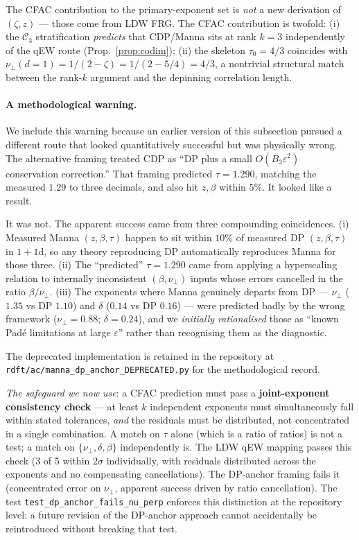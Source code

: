 \documentclass[10pt,a4paper,twocolumn]{article}
\theoremstyle{plain}
\theoremstyle{definition}
\newcommand{\eps}{\varepsilon}
\newcommand{\Cstr}[1]{\mathcal{C}_{#1}}
\begin{document}
The CFAC contribution to the primary-exponent set is \emph{not} a
new derivation of $(\zeta, z)$ --- those come from LDW FRG.  The
CFAC contribution is twofold: (i) the $\Cstr{3}$ stratification
\emph{predicts} that CDP/Manna sits at rank $k=3$ independently of
the qEW route (Prop.~\ref{prop:codim}); (ii) the skeleton
$\tau_0 = 4/3$ coincides with $\nu_\perp(d=1) = 1/(2 - \zeta) =
1/(2 - 5/4) = 4/3$, a nontrivial structural match between the
rank-$k$ argument and the depinning correlation length.

\paragraph{A methodological warning.}
\label{par:warning}
We include this warning because an earlier version of this
subsection pursued a different route that looked quantitatively
successful but was physically wrong.  The alternative framing
treated CDP as ``DP plus a small $O(B_3 \eps^2)$ conservation
correction.''  That framing predicted $\tau = 1.290$, matching
the measured $1.29$ to three decimals, and also hit $z, \beta$
within $5\%$.  It looked like a result.

It was not.  The apparent success came from three compounding
coincidences.  (i) Measured Manna $(z, \beta, \tau)$ happen to
sit within $10\%$ of measured DP $(z, \beta, \tau)$ in $1+1$d, so
any theory reproducing DP automatically reproduces Manna for
those three.  (ii) The ``predicted'' $\tau = 1.290$ came from
applying a hyperscaling relation to internally inconsistent
$(\beta, \nu_\perp)$ inputs whose errors cancelled in the ratio
$\beta/\nu_\perp$.  (iii) The exponents where Manna genuinely
departs from DP --- $\nu_\perp$ ($1.35$ vs DP $1.10$) and
$\delta$ ($0.14$ vs DP $0.16$) --- were predicted badly by the
wrong framework ($\nu_\perp = 0.88$; $\delta = 0.24$), and we
\emph{initially rationalised} those as ``known Pad\'e limitations
at large $\eps$'' rather than recognising them as the diagnostic.

The deprecated implementation is retained in the repository at
\texttt{rdft/ac/manna\_dp\_anchor\_DEPRECATED.py} for the
methodological record.

\emph{The safeguard we now use}: a CFAC prediction must pass a
\textbf{joint-exponent consistency check} --- at least $k$
independent exponents must simultaneously fall within stated
tolerances, \emph{and} the residuals must be distributed, not
concentrated in a single combination.  A match on $\tau$ alone
(which is a ratio of ratios) is not a test; a match on
$\{\nu_\perp, \delta, \beta\}$ independently is.  The LDW
qEW mapping passes this check (3 of 5 within $2\sigma$ individually,
with residuals distributed across the exponents and no
compensating cancellations).  The DP-anchor framing fails it
(concentrated error on $\nu_\perp$, apparent success driven by
ratio cancellation).  The test
\texttt{test\_dp\_anchor\_fails\_nu\_perp} enforces this
distinction at the repository level: a future revision of the
DP-anchor approach cannot accidentally be reintroduced without
breaking that test.
\end{document}
